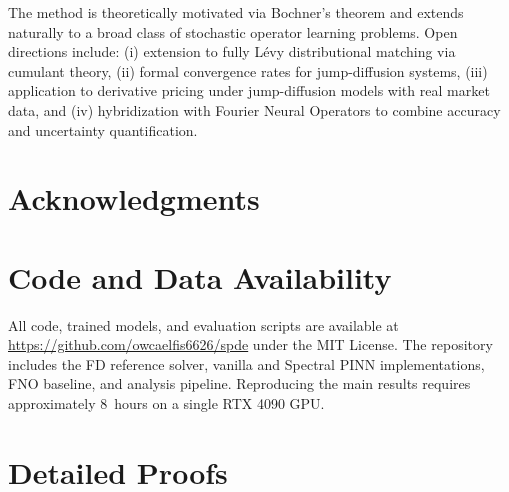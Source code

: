 \documentclass[times,12pt]{elsarticle}
\begin{document}
The method is theoretically motivated via Bochner's theorem and extends naturally to a broad class of stochastic operator learning problems. Open directions include: (i) extension to fully L\'evy distributional matching via cumulant theory, (ii) formal convergence rates for jump-diffusion systems, (iii) application to derivative pricing under jump-diffusion models with real market data, and (iv) hybridization with Fourier Neural Operators to combine accuracy and uncertainty quantification.


\section*{Acknowledgments}



\section*{Code and Data Availability}

All code, trained models, and evaluation scripts are available at \url{https://github.com/owcaelfis6626/spde} under the MIT License. The repository includes the FD reference solver, vanilla and Spectral PINN implementations, FNO baseline, and analysis pipeline. Reproducing the main results requires approximately $8$~hours on a single RTX 4090 GPU.






\appendix

\section{Detailed Proofs}
\label{app:proofs}
\end{document}
